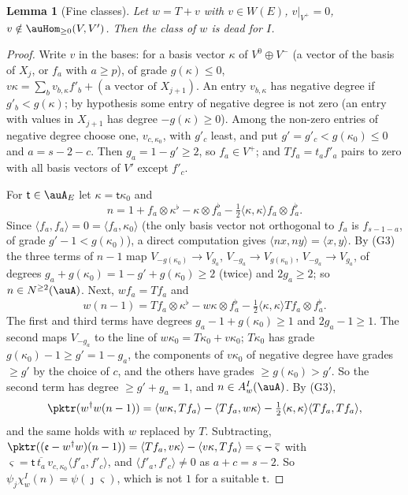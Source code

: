 \documentclass[10pt]{amsart}
\newtheorem{lemma}[theorem]{Lemma}
\theoremstyle{definition}
\theoremstyle{remark}
\providecommand{\aubar}[1]{\overline{#1}}
\begin{document}
\begin{lemma}[Fine classes]\label{pk:fine}
Let $w=T+v$ with $v\in W(E)$, $v|_{V^+}=0$, $v\notin\auHom_{\ge0}(V,V')$. Then the class of $w$ is
dead for $I$.
\end{lemma}
\begin{proof}
Write $v$ in the bases: for a basis vector $\kappa$ of $V^0\oplus V^-$ (a vector of the basis of
$X_j$, or $f_a$ with $a\ge p$), of grade $g(\kappa)\le0$, $v\kappa=\sum_bv_{b,\kappa}f'_b+
(\text{a vector of }X_{j+1})$. An entry $v_{b,\kappa}$ has negative degree if $g'_b<g(\kappa)$;
by hypothesis some entry of negative degree is not zero (an entry with values in $X_{j+1}$ has
degree $-g(\kappa)\ge0$). Among the non-zero entries of negative degree choose one,
$v_{c,\kappa_0}$, with $g'_c$ least, and put $g'=g'_c<g(\kappa_0)\le0$ and $a=s-2-c$. Then
$g_a=1-g'\ge2$, so $f_a\in V^+$; and $Tf_a=t_af'_a$ pairs to zero with all basis vectors of $V'$
except $f'_c$.

For $\mathsf t\in\auA_E$ let $\kappa=\mathsf t\kappa_0$ and
\[
n=1+f_a\otimes\kappa^\flat-\kappa\otimes f_a^\flat-\tfrac12\langle\kappa,\kappa\rangle f_a\otimes
f_a^\flat .
\]
Since $\langle f_a,f_a\rangle=0=\langle f_a,\kappa_0\rangle$ (the only basis vector not orthogonal
to $f_a$ is $f_{s-1-a}$, of grade $g'-1<g(\kappa_0)$), a direct computation gives $\langle nx,ny
\rangle=\langle x,y\rangle$. By (G3) the three terms of $n-1$ map $V_{-g(\kappa_0)}\to V_{g_a}$,
$V_{-g_a}\to V_{g(\kappa_0)}$, $V_{-g_a}\to V_{g_a}$, of degrees $g_a+g(\kappa_0)=1-g'+g(\kappa_0)
\ge2$ (twice) and $2g_a\ge2$; so $n\in N^{\ge2}(\auA)$. Next, $wf_a=Tf_a$ and
\[
w(n-1)=Tf_a\otimes\kappa^\flat-w\kappa\otimes f_a^\flat-\tfrac12\langle\kappa,\kappa\rangle
Tf_a\otimes f_a^\flat .
\]
The first and third terms have degrees $g_a-1+g(\kappa_0)\ge1$ and $2g_a-1\ge1$. The second maps
$V_{-g_a}$ to the line of $w\kappa_0=T\kappa_0+v\kappa_0$; $T\kappa_0$ has grade
$g(\kappa_0)-1\ge g'=1-g_a$, the components of $v\kappa_0$ of negative degree have grades $\ge g'$
by the choice of $c$, and the others have grades $\ge g(\kappa_0)>g'$. So the second term has
degree $\ge g'+g_a=1$, and $n\in A^I_w(\auA)$. By (G3),
\[
\pktr(w^\dagger w(n-1))=\langle w\kappa,Tf_a\rangle-\langle Tf_a,w\kappa\rangle-\tfrac12\langle
\kappa,\kappa\rangle\langle Tf_a,Tf_a\rangle ,
\]
and the same holds with $w$ replaced by $T$. Subtracting,
$\pktr((\mathfrak e-w^\dagger w)(n-1))=\langle Tf_a,v\kappa\rangle-\langle v\kappa,Tf_a\rangle=
\varsigma-\aubar\varsigma$ with $\varsigma=\mathsf t\,\aubar{t_a}\,v_{c,\kappa_0}\langle f'_a,f'_c
\rangle$, and $\langle f'_a,f'_c\rangle\ne0$ as $a+c=s-2$. So $\psi_j\chi^I_w(n)=\psi(\jmath
\varsigma)$, which is not $1$ for a suitable $\mathsf t$.
\end{proof}
\end{document}
